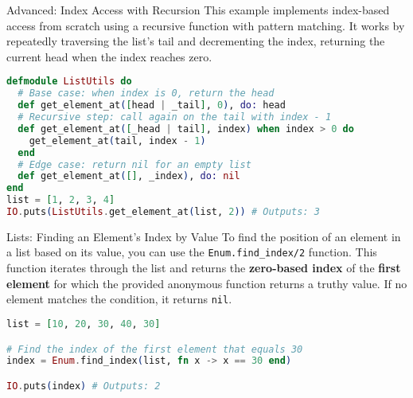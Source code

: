 \documentclass[aspectratio=169, table]{beamer}
\begin{document}
\begin{frame}[fragile]{Advanced: Index Access with Recursion}
\vspace{20pt}
This example implements index-based access from scratch using a recursive function with pattern matching. It works by repeatedly traversing the list's tail and decrementing the index, returning the current head when the index reaches zero.

\begin{lstlisting}[language=Elixir , basicstyle=\ttfamily\footnotesize]
defmodule ListUtils do
  # Base case: when index is 0, return the head
  def get_element_at([head | _tail], 0), do: head
  # Recursive step: call again on the tail with index - 1
  def get_element_at([_head | tail], index) when index > 0 do
    get_element_at(tail, index - 1)
  end
  # Edge case: return nil for an empty list
  def get_element_at([], _index), do: nil
end
list = [1, 2, 3, 4]
IO.puts(ListUtils.get_element_at(list, 2)) # Outputs: 3
\end{lstlisting}
\end{frame}

\begin{frame}[fragile]{Lists: Finding an Element's Index by Value}
\vspace{20pt}
To find the position of an element in a list based on its value, you can use the \texttt{Enum.find\_index/2} function. This function iterates through the list and returns the \textbf{zero-based index} of the \textbf{first element} for which the provided anonymous function returns a truthy value. If no element matches the condition, it returns \texttt{nil}.

\begin{lstlisting}[language=Elixir]
list = [10, 20, 30, 40, 30]

# Find the index of the first element that equals 30
index = Enum.find_index(list, fn x -> x == 30 end)

IO.puts(index) # Outputs: 2
\end{lstlisting}
\end{frame}
\end{document}
